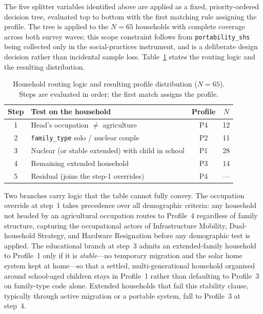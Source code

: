 \documentclass[final,3p,times,onecolumn]{elsarticle}
\begin{document}
The five splitter variables identified above are applied as a fixed, priority-ordered decision tree, evaluated top to bottom with the first matching rule assigning the profile. The tree is applied to the $N = 65$ households with complete coverage across both survey waves; this scope constraint follows from \texttt{portability\_shs} being collected only in the social-practices instrument, and is a deliberate design decision rather than incidental sample loss. Table~\ref{tab:tree} states the routing logic and the resulting distribution.

\begin{table}[ht]
\centering
\caption{Household routing logic and resulting profile distribution ($N=65$). Steps are evaluated in order; the first match assigns the profile.}
\label{tab:tree}
\begin{tabular}{clcc}
\toprule
Step & Test on the household & Profile & $N$ \\
\midrule
1 & Head's occupation $\neq$ agriculture              & P4 & 12 \\
2 & \texttt{family\_type} solo / nuclear couple        & P2 & 11 \\
3 & Nuclear (or stable extended) with child in school  & P1 & 28 \\
4 & Remaining extended household                       & P3 & 14 \\
5 & Residual (joins the step-1 overrides)              & P4 & --- \\
\bottomrule
\end{tabular}
\end{table}

Two branches carry logic that the table cannot fully convey. The occupation override at step~1 takes precedence over all demographic criteria: any household not headed by an agricultural occupation routes to Profile~4 regardless of family structure, capturing the occupational actors of Infrastructure Mobility, Dual-household Strategy, and Hardware Resignation before any demographic test is applied. The educational branch at step~3 admits an extended-family household to Profile~1 only if it is \emph{stable}---no temporary migration and the solar home system kept at home---so that a settled, multi-generational household organised around school-aged children stays in Profile~1 rather than defaulting to Profile~3 on family-type code alone. Extended households that fail this stability clause, typically through active migration or a portable system, fall to Profile~3 at step~4.
\end{document}
